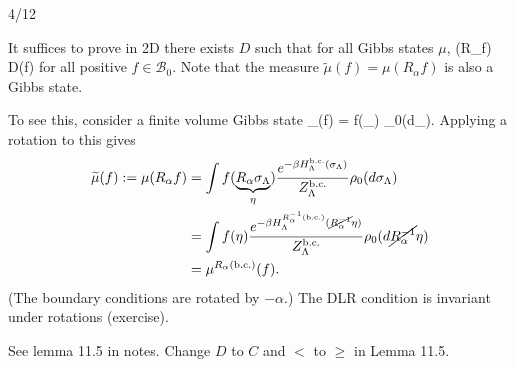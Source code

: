 
{\color{blue}4/12}


It suffices to prove in 2D there exists $D$ such that for all Gibbs states $\mu$,
\be
\mu(R_\alpha f) \le D\mu(f)
\ee
for all positive $f\in \mathcal{B}_0$.
Note that the measure $\widetilde{\mu}(f) = \mu(R_\alpha f)$ is also a Gibbs state. 

To see this, consider a finite volume Gibbs state
\be
\mu_{\Lambda}(f) = \int f(\sigma_\Lambda)  \rho_0(d\sigma_\Lambda).
\ee
Applying a rotation to this gives
\begin{align}
\widetilde{\mu}(f) := \mu(R_\alpha f)&= \int f(\underbrace{R_\alpha\sigma_\Lambda}_{\eta}) \frac{e^{-\beta H^{\text{b.c.}}_\Lambda(\sigma_\Lambda)} }{Z_{\Lambda}^{\text{b.c.}}} \rho_0(d\sigma_\Lambda)\\
&=\int f(\eta) \frac{e^{-\beta H^{R_\alpha^{-1}(\text{b.c.})}_\Lambda (\cancel{R_{\alpha}^{-1}}\eta)} }{Z_{\Lambda}^{\text{b.c.}}} \rho_0(d\cancel{R_{\alpha}^{-1}}\eta)\\
&= \mu^{R_{\alpha}\left( \text{b.c.} \right)}(f).
\end{align}
(The boundary conditions are rotated by $-\alpha$.)
The DLR condition is invariant under rotations (exercise).

{\color{red}See lemma 11.5 in notes. Change $D$ to $C$ and $<$ to $\ge$ in Lemma 11.5.}



